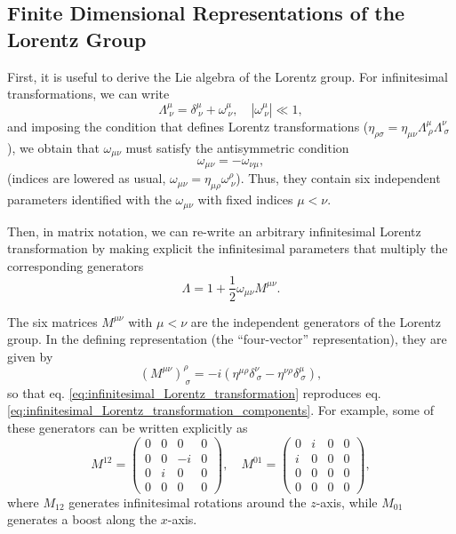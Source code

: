 \subsection{Finite Dimensional Representations of the Lorentz Group}

First, it is useful to derive the Lie algebra of the Lorentz group. For infinitesimal transformations, we can write
\begin{equation}
    \Lambda^\mu_{\ \nu} = \delta^\mu_{\ \nu} + \omega^\mu_{\ \nu}, \quad |\omega^\mu_{\ \nu}| \ll 1,
    \label{eq:infinitesimal_Lorentz_transformation_components}
\end{equation}
and imposing the condition that defines Lorentz transformations ($\eta_{\rho\sigma} = \eta_{\mu\nu} \Lambda^\mu_{\ \rho} \Lambda^\nu_{\ \sigma}$), we obtain that $\omega_{\mu\nu}$ must satisfy the antisymmetric condition
\[
    \omega_{\mu\nu} = -\omega_{\nu\mu},
\]
(indices are lowered as usual, $\omega_{\mu\nu} = \eta_{\mu\rho} \omega^\rho_{\ \nu}$). Thus, they contain six independent parameters identified with the $\omega_{\mu\nu}$ with fixed indices $\mu < \nu$.

Then, in matrix notation, we can re-write an arbitrary infinitesimal Lorentz transformation by making explicit the infinitesimal parameters that multiply the corresponding generators
\begin{equation}
    \Lambda = 1 + \frac{1}{2} \omega_{\mu\nu} M^{\mu\nu}.
    \label{eq:infinitesimal_Lorentz_transformation}
\end{equation}

The six matrices $M^{\mu\nu}$ with $\mu < \nu$ are the independent generators of the Lorentz group. In the defining representation (the ``four-vector'' representation), they are given by
\begin{equation}
    (M^{\mu\nu})^\rho_{\ \sigma} = -i (\eta^{\mu\rho} \delta^\nu_{\ \sigma} - \eta^{\nu\rho} \delta^\mu_{\ \sigma}),
    \label{eq:Lorentz_generators_defining_representation}
\end{equation}
so that eq. \eqref{eq:infinitesimal_Lorentz_transformation} reproduces eq. \eqref{eq:infinitesimal_Lorentz_transformation_components}. For example, some of these generators can be written explicitly as
\[
    M^{12} =
    \begin{pmatrix}
        0 & 0 & 0  & 0 \\
        0 & 0 & -i & 0 \\
        0 & i & 0  & 0 \\
        0 & 0 & 0  & 0
    \end{pmatrix}, \quad
    M^{01} =
    \begin{pmatrix}
        0 & i & 0 & 0 \\
        i & 0 & 0 & 0 \\
        0 & 0 & 0 & 0 \\
        0 & 0 & 0 & 0
    \end{pmatrix},
\]
where $M_{12}$ generates infinitesimal rotations around the $z$-axis, while $M_{01}$ generates a boost along the $x$-axis.

